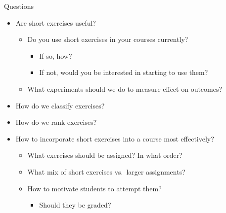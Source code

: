 \documentclass{beamer}
\begin{document}
\begin{frame}{Questions}

\begin{itemize}
\item Are short exercises useful?
  \begin{itemize}
  \item Do you use short exercises in your courses currently?
    \begin{itemize}
    \item If so, how?
    \item If not, would you be interested in starting to use them?
    \end{itemize}
  \item What experiments should we do to measure effect on outcomes?
  \end{itemize}
\item How do we classify exercises?
\item How do we rank exercises?
\item How to incorporate short exercises into a course most effectively?
  \begin{itemize}
  \item What exercises should be assigned? In what order?
  \item What mix of short exercises vs.\ larger assignments?
  \item How to motivate students to attempt them?
    \begin{itemize}
    \item Should they be graded?
    \end{itemize}
  \end{itemize}
\end{itemize}

\end{frame}
\end{document}
